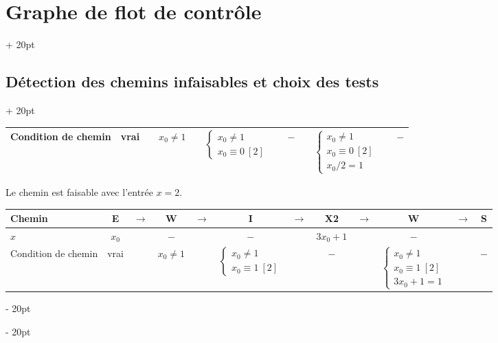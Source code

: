 \documentclass[a4paper, 12pt, twoside]{article}
\newcommand{\ind}[1][20pt]{\advance\leftskip + #1}
\newcommand{\deind}[1][20pt]{\advance\leftskip - #1}
\newenvironment{indentedenv}[1][20pt]{\par \ind[#1]}{\par \deind}
\newenvironment{indt}[2][20pt]{#2 \begin{indentedenv}[#1]}{\end{indentedenv}} %
\begin{document}
\begin{indt}{\section{Graphe de flot de contrôle}}
\begin{indt}{\subsection{Détection des chemins infaisables et choix des tests}}
\begin{tabular}{|p{50pt}|ccccccccccc|}
                \hline
                Condition de chemin
                & vrai
                & \vline
                & $x_0 \neq 1$
                & \vline
                & $\begin{cases} x_0 \neq 1 \\ x_0 \equiv 0\ [2] \end{cases}\!\!\!\!\!\!\!\!$
                & \vline
                & $-$
                & \vline
                & $\begin{cases} x_0 \neq 1 \\ x_0 \equiv 0\ [2] \\ x_0 / 2 = 1\end{cases}\!\!\!\!\!\!\!\!$
                & \vline
                & $-$
                \\
                \hline
            \end{tabular}
            
            \vspace{6pt}
            
            Le chemin est faisable avec l'entrée $x = 2$.
            
            \vspace{12pt}
            
            \begin{tabular}{|p{50pt}|ccccccccccc|}
                \hline
                Chemin
                & E
                & $\rightarrow$
                & W
                & $\rightarrow$
                & I
                & $\rightarrow$
                & X2
                & $\rightarrow$
                & W
                & $\rightarrow$
                & S
                \\
                \hline
                $x$
                & $x_0$
                & \vline
                & $-$
                & \vline
                & $-$
                & \vline
                & $3x_0 + 1$
                & \vline
                & $-$
                &&
                \\
                
                \hline
                Condition de chemin
                & vrai
                & \vline
                & $x_0 \neq 1$
                & \vline
                & $\begin{cases} x_0 \neq 1 \\ x_0 \equiv 1\ [2] \end{cases}\!\!\!\!\!\!\!\!$
                & \vline
                & $-$
                & \vline
                & $\begin{cases} x_0 \neq 1 \\ x_0 \equiv 1\ [2] \\ 3x_0 + 1 = 1 \end{cases}\!\!\!\!\!\!\!\!$
                & \vline
                & $-$
                \\
                \hline
            \end{tabular}
            

\end{indt}
\end{indt}
\end{document}
